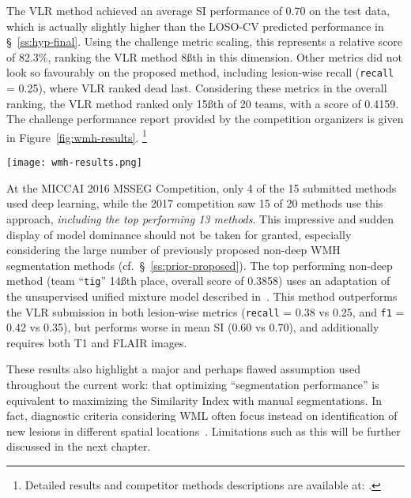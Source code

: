 The VLR method achieved an average SI performance of 0.70 on the test data,
which is actually slightly higher than the LOSO-CV predicted performance in \S~\ref{ss:hyp-final}.
Using the challenge metric scaling, this represents a relative score of 82.3\%,
ranking the VLR method 8\ss{th} in this dimension.
Other metrics did not look so favourably on the proposed method,
including lesion-wise recall (\texttt{recall} = 0.25), where VLR ranked dead last.
Considering these metrics in the overall ranking,
the VLR method ranked only 15\ss{th} of 20 teams, with a score of 0.4159.
The challenge performance report provided by the competition organizers
is given in Figure~\ref{fig:wmh-results}.%
\footnote{Detailed results and competitor methods descriptions are available at:
  .}
\par
\begin{sidewaysfigure}
    \centering
    \texttt{[image: wmh-results.png]}\\
    \caption{Results report for the submitted method provided by the WMH Segmentation Competition.}%
    \label{fig:wmh-results}
\end{sidewaysfigure}
At the MICCAI 2016 MSSEG Competition, only 4 of the 15 submitted methods used deep learning,
while the 2017 competition saw 15 of 20 methods use this approach,
\textit{including the top performing 13 methods}.
This impressive and sudden display of model dominance should not be taken for granted,
especially considering the large number of previously proposed non-deep WMH segmentation methods
(cf.~\S~\ref{ss:prior-proposed}).
The top performing non-deep method (team ``\texttt{tig}'' 14\ss{th} place, overall score of 0.3858)
uses an adaptation of the unsupervised unified mixture model described in~\cite{Sudre2015}.
This method outperforms the VLR submission in both lesion-wise metrics
(\texttt{recall} = 0.38 vs 0.25, and \texttt{f1} = 0.42 vs 0.35),
but performs worse in mean SI (0.60 vs 0.70), and additionally requires both T1 and FLAIR images.
\par
These results also highlight a major and perhaps flawed assumption used
throughout the current work:
that optimizing ``segmentation performance'' is equivalent to
maximizing the Similarity Index with manual segmentations.
In fact, diagnostic criteria considering WML often focus instead on
identification of new lesions in different spatial locations~\cite{Polman2011,Sorbi2012}.
Limitations such as this will be further discussed in the next chapter.

